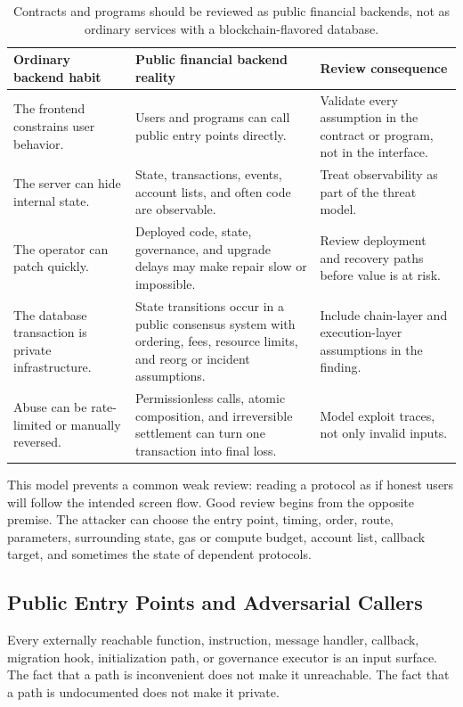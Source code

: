 \begin{table}[htbp]
\centering
\small
\renewcommand{\arraystretch}{1.18}
\begin{tabularx}{\textwidth}{@{}>{\RaggedRight\arraybackslash}p{}>{\RaggedRight\arraybackslash}p{}X@{}}
\toprule
Ordinary backend habit & Public financial backend reality & Review consequence \\
\midrule
The frontend constrains user behavior. & Users and programs can call public entry points directly. & Validate every assumption in the contract or program, not in the interface. \\
The server can hide internal state. & State, transactions, events, account lists, and often code are observable. & Treat observability as part of the threat model. \\
The operator can patch quickly. & Deployed code, state, governance, and upgrade delays may make repair slow or impossible. & Review deployment and recovery paths before value is at risk. \\
The database transaction is private infrastructure. & State transitions occur in a public consensus system with ordering, fees, resource limits, and reorg or incident assumptions. & Include chain-layer and execution-layer assumptions in the finding. \\
Abuse can be rate-limited or manually reversed. & Permissionless calls, atomic composition, and irreversible settlement can turn one transaction into final loss. & Model exploit traces, not only invalid inputs. \\
\bottomrule
\end{tabularx}
\caption{Contracts and programs should be reviewed as public financial backends, not as ordinary services with a blockchain-flavored database.}
\end{table}

This model prevents a common weak review: reading a protocol as if honest users will follow the intended screen flow. Good review begins from the opposite premise. The attacker can choose the entry point, timing, order, route, parameters, surrounding state, gas or compute budget, account list, callback target, and sometimes the state of dependent protocols.

\subsection{Public Entry Points and Adversarial Callers}

Every externally reachable function, instruction, message handler, callback, migration hook, initialization path, or governance executor is an input surface. The fact that a path is inconvenient does not make it unreachable. The fact that a path is undocumented does not make it private.

